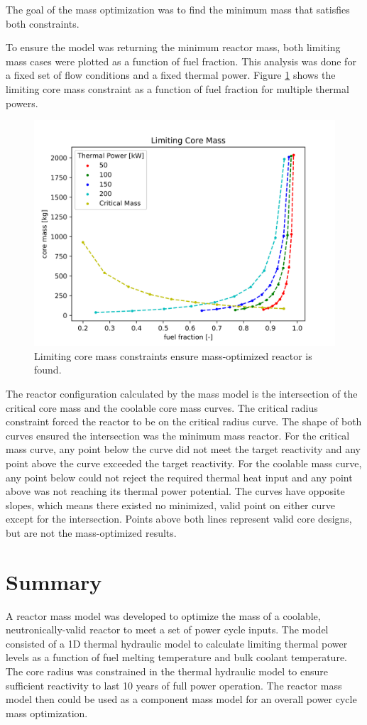 The goal of the mass optimization was to find the minimum mass that satisfies
both constraints.

To ensure the model was returning the minimum reactor mass, both limiting mass
cases were plotted as a function of fuel fraction. This analysis was done for a
fixed set of flow conditions and a fixed thermal power. Figure
\ref{fig:limiting_core_mass} shows the limiting core mass constraint as a
function of fuel fraction for multiple thermal powers.

\begin{figure}[h]
    \centering
    \includegraphics[width=5in]{../images/limiting_core_mass.png}
\caption{Limiting core mass constraints ensure mass-optimized reactor is found.}
\label{fig:limiting_core_mass}
\end{figure}

The reactor configuration calculated by the mass model is the intersection of
the critical core mass and the coolable core mass curves. The critical radius
constraint forced the reactor to be on the critical radius curve. The shape of
both curves ensured the intersection was the minimum mass reactor. For the
critical mass curve, any point below the curve did not meet the target
reactivity and any point above the curve exceeded the target reactivity. For the
coolable mass curve, any point below could not reject the required thermal heat
input and any point above was not reaching its thermal power potential. The
curves have opposite slopes, which means there existed no minimized, valid point on either
curve except for the intersection. Points above both lines represent valid
core designs, but are not the mass-optimized results.

\section{Summary}
A reactor mass model was developed to optimize the mass of a coolable,
neutronically-valid reactor to meet a set of power cycle inputs. The model
consisted of a 1D thermal hydraulic model to calculate limiting thermal power
levels as a function of fuel melting temperature and bulk coolant temperature.
The core radius was constrained in the thermal hydraulic model to ensure
sufficient reactivity to last 10 years of full power operation. The reactor mass
model then could be used as a component mass model for an overall power cycle
mass optimization.
